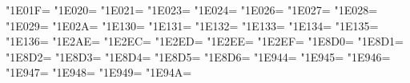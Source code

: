 \XeTeXcharclass"1E01F=\KclassCM
\XeTeXcharclass"1E020=\KclassCM
\XeTeXcharclass"1E021=\KclassCM
\XeTeXcharclass"1E023=\KclassCM
\XeTeXcharclass"1E024=\KclassCM
\XeTeXcharclass"1E026=\KclassCM
\XeTeXcharclass"1E027=\KclassCM
\XeTeXcharclass"1E028=\KclassCM
\XeTeXcharclass"1E029=\KclassCM
\XeTeXcharclass"1E02A=\KclassCM
\XeTeXcharclass"1E130=\KclassCM
\XeTeXcharclass"1E131=\KclassCM
\XeTeXcharclass"1E132=\KclassCM
\XeTeXcharclass"1E133=\KclassCM
\XeTeXcharclass"1E134=\KclassCM
\XeTeXcharclass"1E135=\KclassCM
\XeTeXcharclass"1E136=\KclassCM
\XeTeXcharclass"1E2AE=\KclassCM
\XeTeXcharclass"1E2EC=\KclassCM
\XeTeXcharclass"1E2ED=\KclassCM
\XeTeXcharclass"1E2EE=\KclassCM
\XeTeXcharclass"1E2EF=\KclassCM
\XeTeXcharclass"1E8D0=\KclassCM
\XeTeXcharclass"1E8D1=\KclassCM
\XeTeXcharclass"1E8D2=\KclassCM
\XeTeXcharclass"1E8D3=\KclassCM
\XeTeXcharclass"1E8D4=\KclassCM
\XeTeXcharclass"1E8D5=\KclassCM
\XeTeXcharclass"1E8D6=\KclassCM
\XeTeXcharclass"1E944=\KclassCM
\XeTeXcharclass"1E945=\KclassCM
\XeTeXcharclass"1E946=\KclassCM
\XeTeXcharclass"1E947=\KclassCM
\XeTeXcharclass"1E948=\KclassCM
\XeTeXcharclass"1E949=\KclassCM
\XeTeXcharclass"1E94A=\KclassCM


